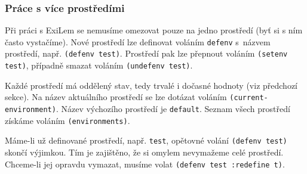 \subsubsection{Práce s více prostředími}
\label{multiple environments}
Při práci s ExiLem se nemusíme omezovat pouze na jedno prostředí (byť si s ním
často vystačíme). Nové prostředí lze definovat voláním \verb|defenv| s~názvem
prostředí, např. \verb|(defenv test)|. Prostředí pak lze přepnout voláním
\verb|(setenv test)|, případně smazat voláním \verb|(undefenv test)|.

Každé prostředí má oddělený stav, tedy trvalé i dočasné hodnoty (viz předchozí
sekce). Na název aktuálního prostředí se lze dotázat voláním
\verb|(current-environment)|. Název výchozího prostředí je \verb|default|.
Seznam všech prostředí získáme voláním \verb|(environments)|.

Máme-li už definované prostředí, např. \verb|test|, opětovné volání
\verb|(defenv test)| skončí výjimkou. Tím je zajištěno, že si omylem nevymažeme
celé prostředí.  Chceme-li jej opravdu vymazat, musíme volat
\verb|(defenv test :redefine t)|.
